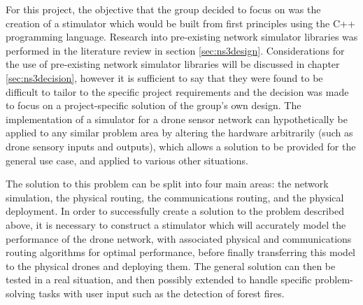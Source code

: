 For this project, the objective that the group decided to focus on was the creation of a stimulator which would be built from first principles using the C++ programming language. Research into pre-existing network simulator libraries was performed in the literature review in section \ref{sec:ns3design}. Considerations for the use of pre-existing network simulator libraries will be discussed in chapter \ref{sec:ns3decision}, however it is sufficient to say that they were found to be difficult to tailor to the specific project requirements and the decision was made to focus on a project-specific solution of the group’s own design. The implementation of a simulator for a drone sensor network can hypothetically be applied to any similar problem area by altering the hardware arbitrarily (such as drone sensory inputs and outputs), which allows a solution to be provided for the general use case, and applied to various other situations.

The solution to this problem can be split into four main areas: the network simulation, the physical routing, the communications routing, and the physical deployment. In order to successfully create a solution to the problem described above, it is necessary to construct a stimulator which will accurately model the performance of the drone network, with associated physical and communications routing algorithms for optimal performance, before finally transferring this model to the physical drones and deploying them. The general solution can then be tested in a real situation, and then possibly extended to handle specific problem-solving tasks with user input such as the detection of forest fires. 
